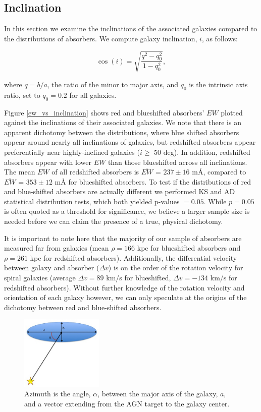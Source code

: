 \documentclass[iop]{emulateapj-rtx4}
\begin{document}
\subsection{Inclination}
In this section we examine the inclinations of the associated galaxies compared to the distributions of absorbers. We compute galaxy inclination, $i$, as follows:

\begin{equation}
	\cos(i) = \sqrt{\frac{q^2 - q_0^2}{1 - q_0^2}},
\end{equation}

\noindent where $q = b/a$, the ratio of the minor to major axis, and $q_0$ is the intrinsic axis ratio, set to $q_0 = 0.2$ for all galaxies.

Figure \ref{ew_vs_inclination} shows red and blueshifted absorbers' $EW$ plotted against the inclinations of their associated galaxies. We note that there is an apparent dichotomy between the distributions, where blue shifted absorbers appear around nearly all inclinations of galaxies, but redshifted absorbers appear preferentially near highly-inclined galaxies ($i \geq$ 50 deg). In addition, redshifted absorbers appear with lower $EW$ than those blueshifted across all inclinations. The mean $EW$ of all redshifted absorbers is $\overline{EW}$ = $237 \pm 16$  $\textrm{m\AA}$, compared to $\overline{EW}$ = $353 \pm 12$ $\textrm{m\AA}$ for blueshifted absorbers. To test if the distributions of red and blue-shifted absorbers are actually different we performed KS and AD statistical distribution tests, which both yielded p-values $=0.05$. While $p=0.05$ is often quoted as a threshold for significance, we believe a larger sample size is needed before we can claim the presence of a true, physical dichotomy.

It is important to note here that the majority of our sample of absorbers are measured far from galaxies (mean $\rho = 166$ kpc for blueshifted absorbers and $\rho = 261$ kpc for redshifted absorbers). Additionally, the differential velocity between galaxy and absorber ($\Delta v$) is on the order of the rotation velocity for spiral galaxies (average $\Delta v = 89$ km/s for blueshifted, $\Delta v = -134$ km/s for redshifted absorbers). Without further knowledge of the rotation velocity and orientation of each galaxy however, we can only speculate at the origins of the dichotomy between red and blue-shifted absorbers.

\begin{figure}[ht!]
        \centering
        \includegraphics[width=0.35\textwidth]{azimuth_illustration_cut.jpg}
        \caption{\small{Azimuth is the angle, $\alpha$, between the major axis of the galaxy, $a$, and a vector extending from the AGN target to the galaxy center.}}
        \label{azimuth_illustration}
\end{figure} 
\end{document}
